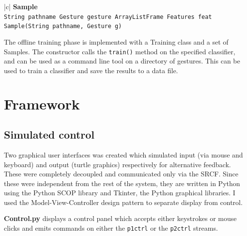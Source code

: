 \documentclass[12pt,a4,notitlepage]{report}
\renewcommand{\_}{\texttt{\symbol{95}}}
\newcommand{\<}{\texttt{\symbol{60}}}
\renewcommand{\>}{\texttt{\symbol{62}}}
\newcommand{\class}[1]{\textbf{#1}}
\newcommand{\scopendpoint}[1]{\texttt{#1}}
\newcommand{\variable}[1]{\texttt{#1}}
\begin{document}
\begin{tabular}{|c|} \hline 
\class{Sample} \\ \hline
{}
{\variable{String pathname \newline
Gesture gesture \newline
ArrayList\<Frame\> \newline
Features feat \newline
Sample(String pathname, Gesture g)
} } \\ \hline
\end{tabular}

The offline training phase is implemented with a Training class and a set of Samples. The constructor calls the \variable{train()} method on the specified classifier, and can be used as a command line tool on a directory of gestures. This can be used to train a classifier and save the results to a data file.

\section{Framework}

\subsection{Simulated control}

Two graphical user interfaces was created which simulated input (via mouse and keyboard) and output (turtle graphics) respectively for alternative feedback. These were completely decoupled and communicated only via the SRCF. Since these were independent from the rest of the system, they are written in Python using the Python SCOP library and Tkinter, the Python graphical libraries. I used the Model-View-Controller design pattern to separate display from control.

\class{Control.py} displays a control panel which accepts either keystrokes or mouse clicks and emits commands on either the \scopendpoint{p1ctrl} or the \scopendpoint{p2ctrl} streams.
\end{document}
